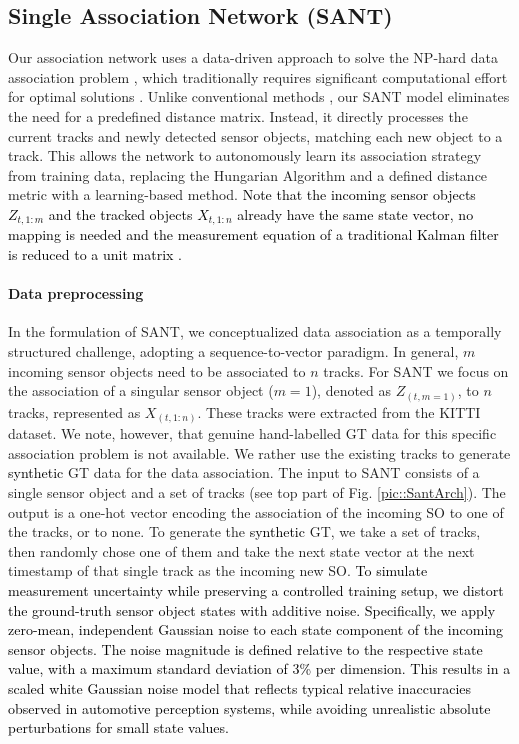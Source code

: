 \documentclass[letterpaper, 10 pt, journal, twoside]{IEEEtran}
\newcommand{\red}[1]{\textcolor{black}{#1}}
\begin{document}
\subsection{Single Association Network (SANT)}
Our association network uses a data-driven approach to solve the NP-hard data association problem {\cite{DA_hungarian.1955,DA_JPDA.1993}}, which traditionally requires significant computational effort for optimal solutions {\cite{DA_hungarian.1955}}.
Unlike conventional methods {\cite{DL_RNN_mot.2016, DL_RNN_data_association.2019}}, our \ac{SANT} model eliminates the need for a predefined distance matrix. Instead, it directly processes the current tracks and newly detected sensor objects, matching each new object to a track. This allows the network to autonomously learn its association strategy from training data, replacing the Hungarian Algorithm and a defined distance metric with a learning-based method. \red{Note that the incoming sensor objects $Z_{t,1:m}$ and the tracked objects $X_{t,1:n}$ already have the same state vector, no mapping is needed and the measurement equation of a traditional Kalman filter is reduced to a unit matrix \cite{welch2006introduction}.}

\paragraph{Data preprocessing}
In the formulation of \ac{SANT}, we conceptualized data association as a temporally structured challenge, adopting a sequence-to-vector paradigm.
In general, $m$ incoming sensor objects need to be associated to $n$ tracks.
For \ac{SANT} we focus on the association of a singular sensor object ($m=1$), denoted as $Z_{(t,m=1)}$, to $n$ tracks, represented as $X_{(t,1:n)}$.
These tracks were extracted from the KITTI dataset.
We note, however, that genuine hand-labelled \ac{GT} data for this specific association problem is not available. We rather use the existing tracks to  generate \red{synthetic} \ac{GT} data for the data association.
The input to \ac{SANT} consists of a single sensor object and a set of tracks (see top part of Fig. \ref{pic::SantArch}).
The output is a one-hot vector encoding the association of the incoming \ac{SO} to one of the tracks, or to none.
To generate the \red{synthetic} \ac{GT}, we take a set of tracks, then randomly chose one of them and take the next state vector at the next timestamp of that single track as the incoming new \ac{SO}. %
\red{To simulate measurement uncertainty while preserving a controlled training setup, we distort the ground-truth sensor object states with additive noise. Specifically, we apply zero-mean, independent Gaussian noise to each state component of the incoming sensor objects.
The noise magnitude is defined relative to the respective state value, with a maximum standard deviation of 3\% per dimension. This results in a scaled white Gaussian noise model that reflects typical relative inaccuracies observed in automotive perception systems, while avoiding unrealistic absolute perturbations for small state values.}
\end{document}
